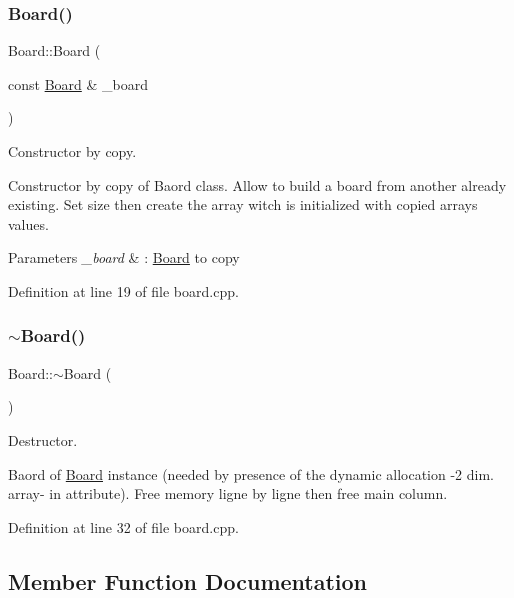 \subsubsection{\texorpdfstring{Board()}{Board()}\hspace{0.1cm}{\footnotesize\ttfamily [2/2]}}
{\footnotesize\ttfamily Board\+::\+Board (\begin{DoxyParamCaption}\item[{const \hyperlink{class_board}{Board} \&}]{\+\_\+board }\end{DoxyParamCaption})}



Constructor by copy. 

Constructor by copy of Baord class. Allow to build a board from another already existing. Set size then create the array witch is initialized with copied array\textquotesingle{}s values.


\begin{DoxyParams}{Parameters}
{\em \+\_\+board} & \+: \hyperlink{class_board}{Board} to copy \\
\hline
\end{DoxyParams}


Definition at line 19 of file board.\+cpp.

\hypertarget{class_board_af73f45730119a1fd8f6670f53f959e68}{}\label{class_board_af73f45730119a1fd8f6670f53f959e68} 
\subsubsection{\texorpdfstring{$\sim$\+Board()}{~Board()}}
{\footnotesize\ttfamily Board\+::$\sim$\+Board (\begin{DoxyParamCaption}{ }\end{DoxyParamCaption})}



Destructor. 

Baord of \hyperlink{class_board}{Board} instance (needed by presence of the dynamic allocation -\/2 dim. array-\/ in attribute). Free memory ligne by ligne then free main column. 

Definition at line 32 of file board.\+cpp.



\subsection{Member Function Documentation}
\hypertarget{class_board_a533f62eccb7919cd20aba0ae9ea0e790}{}\label{class_board_a533f62eccb7919cd20aba0ae9ea0e790} 
